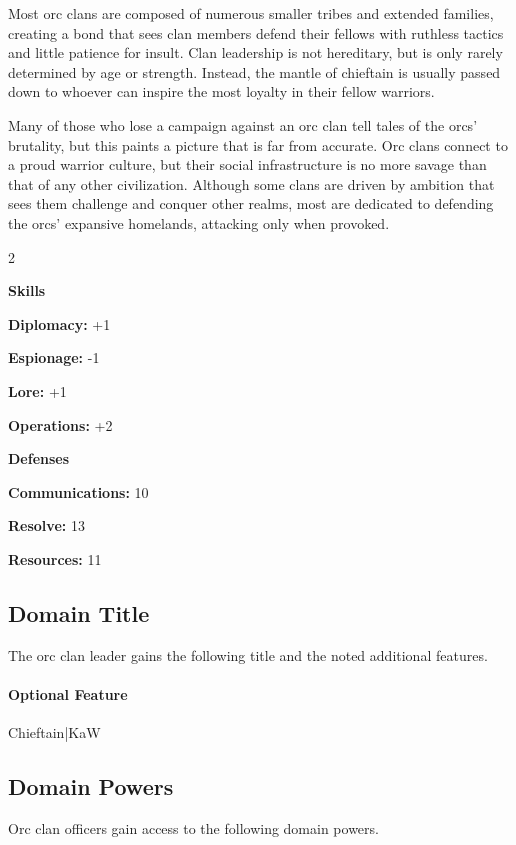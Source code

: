 \documentclass[10pt,a4paper,twoside,bg=print,twocolumn,openany,nodeprecatedcode]{dndbook}
\begin{document}
Most orc clans are composed of numerous smaller tribes and extended families, creating a bond that sees clan members defend their fellows with ruthless tactics and little patience for insult. Clan leadership is not hereditary, but is only rarely determined by age or strength. Instead, the mantle of chieftain is usually passed down to whoever can inspire the most loyalty in their fellow warriors.

Many of those who lose a campaign against an orc clan tell tales of the orcs' brutality, but this paints a picture that is far from accurate. Orc clans connect to a proud warrior culture, but their social infrastructure is no more savage than that of any other civilization. Although some clans are driven by ambition that sees them challenge and conquer other realms, most are dedicated to defending the orcs' expansive homelands, attacking only when provoked.


\begin{itemize}
\begin{multicols}{2}
\item \textbf{Skills}
\item \textbf{Diplomacy:} +1
\item \textbf{Espionage:} -1
\item \textbf{Lore:} +1
\item \textbf{Operations:} +2
\item \textbf{Defenses}
\item \textbf{Communications:} 10
\item \textbf{Resolve:} 13
\item \textbf{Resources:} 11
\end{multicols}

\end{itemize}

\subsection{Domain Title}
The orc clan leader gains the following title and the noted additional features.

\paragraph{Optional Feature}
Chieftain|KaW

\subsection{Domain Powers}
Orc clan officers gain access to the following domain powers.
\end{document}
